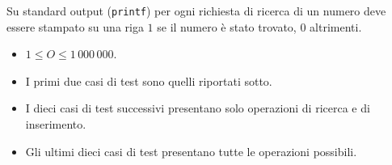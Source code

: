 \OutputFile
Su standard output (\texttt{printf}) per ogni richiesta di ricerca di un
numero deve essere stampato su una riga $1$ se il numero è stato trovato, $0$
altrimenti.
	


\Constraints

\begin{itemize}[nolistsep, itemsep=2mm]
    \item $1 \leq O \leq 1\,000\,000$.
    \item I primi due casi di test sono quelli riportati sotto.
    \item I dieci casi di test successivi presentano solo operazioni di
        ricerca e di inserimento.
    \item Gli ultimi dieci casi di test presentano tutte le operazioni
        possibili.
\end{itemize}



\Examples

\begin{example}
%
\end{example}
\begin{example}
%
\end{example}



